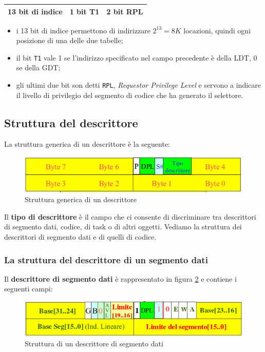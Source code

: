 \documentclass[11pt]{book}
\begin{document}
\begin{center}
\begin{tabular}{|c|c|c|}
\hline
13 bit di indice & 1 bit T1 & 2 bit RPL \\
\hline
\end{tabular}
\end{center}

\begin{itemize}
\item i 13 bit di indice permettono di indirizzare $2^{13} = 8 K$
  locazioni, quindi ogni posizione di una delle due tabelle;
\item il bit \texttt{T1} vale 1 se l'indirizzo specificato nel campo
  precedente \`e della LDT, 0 se della GDT;
\item gli ultimi due bit son detti \texttt{RPL}, {\em Requestor
    Privilege Level} e servono a indicare il livello di privilegio del
  segmento di codice che ha generato il selettore.
\end{itemize}

\subsection{Struttura del descrittore}

La struttura generica di un descrittore \`e la seguente:

\begin{figure}[h]
  \centering
  \includegraphics[width=.6\textwidth]{images/descrittore.png}
  \caption{Struttura generica di un descrittore}
  \label{descrittore}
\end{figure}

Il {\bf tipo di descrittore} \`e il campo che ci consente di
discriminare tra descrittori di segmento dati, codice, di task o di
altri oggetti. Vediamo la struttura dei descrittori di segmento dati e
di quelli di codice.

\subsubsection{La struttura del descrittore di un segmento dati}

Il {\bf descrittore di segmento dati} \`e rappresentato in figura
\ref{descrittoredati} e contiene i seguenti campi:

\begin{figure}[h]
  \centering
  \includegraphics[width=.6\textwidth]{images/descrittoredati.png}
  \caption{Struttura di un descrittore di segmento dati}
  \label{descrittoredati}
\end{figure}
\end{document}
